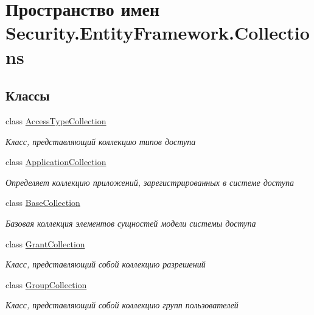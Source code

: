 \hypertarget{namespace_security_1_1_entity_framework_1_1_collections}{}\section{Пространство имен Security.\+Entity\+Framework.\+Collections}
\label{namespace_security_1_1_entity_framework_1_1_collections}
\subsection*{Классы}
\begin{DoxyCompactItemize}
\item 
class \hyperlink{class_security_1_1_entity_framework_1_1_collections_1_1_access_type_collection}{Access\+Type\+Collection}
\begin{DoxyCompactList}\small\item\em Класс, представляющий коллекцию типов доступа \end{DoxyCompactList}\item 
class \hyperlink{class_security_1_1_entity_framework_1_1_collections_1_1_application_collection}{Application\+Collection}
\begin{DoxyCompactList}\small\item\em Определяет коллекцию приложений, зарегистрированных в системе доступа \end{DoxyCompactList}\item 
class \hyperlink{class_security_1_1_entity_framework_1_1_collections_1_1_base_collection}{Base\+Collection}
\begin{DoxyCompactList}\small\item\em Базовая коллекция элементов сущностей модели системы доступа \end{DoxyCompactList}\item 
class \hyperlink{class_security_1_1_entity_framework_1_1_collections_1_1_grant_collection}{Grant\+Collection}
\begin{DoxyCompactList}\small\item\em Класс, представляющий собой коллекцию разрешений \end{DoxyCompactList}\item 
class \hyperlink{class_security_1_1_entity_framework_1_1_collections_1_1_group_collection}{Group\+Collection}
\begin{DoxyCompactList}\small\item\em Класс, представляющий собой коллекцию групп пользователей \end{DoxyCompactList}\item 

\end{DoxyCompactItemize}
